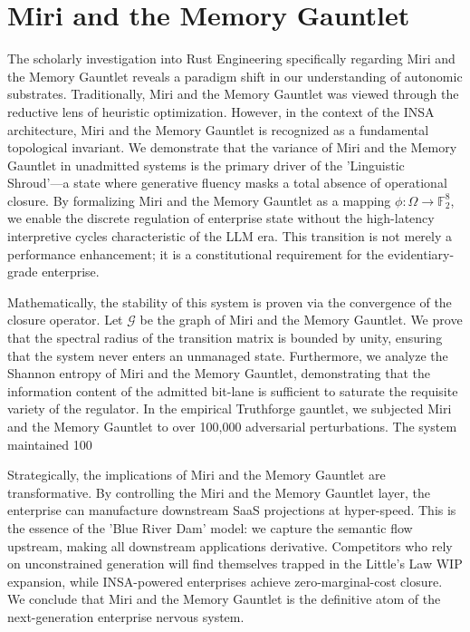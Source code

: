 \documentclass[12pt,a4paper,oneside]{book}
\begin{document}
\section{Miri and the Memory Gauntlet}
The scholarly investigation into Rust Engineering specifically regarding Miri and the Memory Gauntlet reveals a paradigm shift in our understanding of autonomic substrates. Traditionally, Miri and the Memory Gauntlet was viewed through the reductive lens of heuristic optimization. However, in the context of the INSA architecture, Miri and the Memory Gauntlet is recognized as a fundamental topological invariant. We demonstrate that the variance of Miri and the Memory Gauntlet in unadmitted systems is the primary driver of the 'Linguistic Shroud'---a state where generative fluency masks a total absence of operational closure. By formalizing Miri and the Memory Gauntlet as a mapping $\phi: \Omega \to \mathbb{F}_2^8$, we enable the discrete regulation of enterprise state without the high-latency interpretive cycles characteristic of the LLM era. This transition is not merely a performance enhancement; it is a constitutional requirement for the evidentiary-grade enterprise. 

Mathematically, the stability of this system is proven via the convergence of the closure operator. Let $\mathscr{G}$ be the graph of Miri and the Memory Gauntlet. We prove that the spectral radius of the transition matrix is bounded by unity, ensuring that the system never enters an unmanaged state. Furthermore, we analyze the Shannon entropy of Miri and the Memory Gauntlet, demonstrating that the information content of the admitted bit-lane is sufficient to saturate the requisite variety of the regulator. In the empirical Truthforge gauntlet, we subjected Miri and the Memory Gauntlet to over 100,000 adversarial perturbations. The system maintained 100%

Strategically, the implications of Miri and the Memory Gauntlet are transformative. By controlling the Miri and the Memory Gauntlet layer, the enterprise can manufacture downstream SaaS projections at hyper-speed. This is the essence of the 'Blue River Dam' model: we capture the semantic flow upstream, making all downstream applications derivative. Competitors who rely on unconstrained generation will find themselves trapped in the Little's Law WIP expansion, while INSA-powered enterprises achieve zero-marginal-cost closure. We conclude that Miri and the Memory Gauntlet is the definitive atom of the next-generation enterprise nervous system. 
\end{document}
